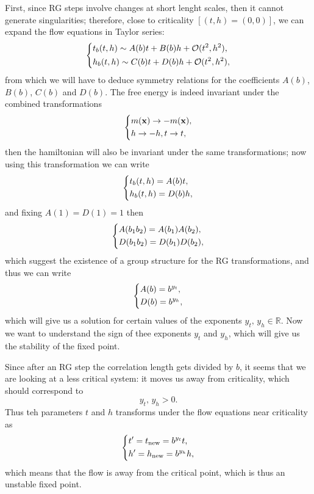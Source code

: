 First, since RG steps involve changes at short lenght scales, then it cannot generate singularities; therefore, close to criticality \([(t,h)=(0,0)]\), we can expand the flow equations in Taylor series:
\[
    \begin{dcases}
        t_b(t,h) \sim A(b) t + B(b) h + \mathcal{O}(t^2, h^2), \\
        h_b(t,h) \sim C(b) t + D(b) h + \mathcal{O}(t^2, h^2),
    \end{dcases}
\]
from which we will have to deduce symmetry relations for the coefficients \(A(b)\), \(B(b)\), \(C(b)\) and \(D(b)\). The free energy is indeed invariant under the combined transformations
\[
    \begin{dcases}
        m(\mathbf{x}) \to -m(\mathbf{x}), \\
        h \to -h,
        t \to t,
    \end{dcases}
\]
then the hamiltonian will also be invariant under the same transformations; now using this transformation we can write
\[
    \begin{dcases}
        t_b (t,h) = A(b) t, \\
        h_b (t,h) = D(b) h,
    \end{dcases}
\]
and fixing \(A(1) = D(1) = 1\) then
\[
    \begin{dcases}
        A(b_1 b_2) = A(b_1)A(b_2), \\
        D(b_1 b_2) = D(b_1)D(b_2),
    \end{dcases}
\]
which suggest the existence of a group structure for the RG transformations, and thus we can write
\[
    \begin{dcases}
        A(b) = b^{y_t}, \\
        D(b) = b^{y_h},
    \end{dcases}
\]
which will give us a solution for certain values of the exponents \(y_t,\,y_h \in \mathbb{R}\). Now we want to understand the sign of thee exponents \(y_t\) and \(y_h\), which will give us the stability of the fixed point.

Since after an RG step the correlation length gets divided by \(b\), it seems that we are looking at a less critical system: it moves us away from criticality, which should correspond to
\[
    y_t,\,y_h >0.
\]
Thus teh parameters \(t\) and \(h\) transforms under the flow equations near criticality as
\[
    \begin{dcases}
        t^{\prime} = t_{\text{new}} = b^{y_t} t, \\
        h^{\prime} = h_{\text{new}} = b^{y_h} h,
    \end{dcases}
\]
which means that the flow is away from the critical point, which is thus an unstable fixed point.

